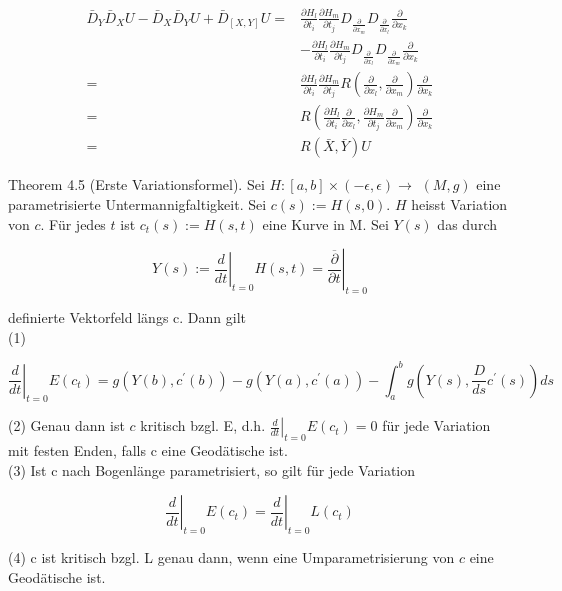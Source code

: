 \documentclass[10pt]{article}
\begin{document}
$$
\begin{aligned}
\bar{D}_{Y} \bar{D}_{X} U-\bar{D}_{X} \bar{D}_{Y} U+\bar{D}_{[X, Y]} U= & \frac{\partial H_{l}}{\partial t_{i}} \frac{\partial H_{m}}{\partial t_{j}} D_{\frac{\partial}{\partial x_{m}}} D_{\frac{\partial}{\partial x_{l}}} \frac{\partial}{\partial x_{k}} \\
& -\frac{\partial H_{l}}{\partial t_{i}} \frac{\partial H_{m}}{\partial t_{j}} D_{\frac{\partial}{\partial x_{l}}} D_{\frac{\partial}{\partial x_{m}}} \frac{\partial}{\partial x_{k}} \\
= & \frac{\partial H_{l}}{\partial t_{i}} \frac{\partial H_{m}}{\partial t_{j}} R\left(\frac{\partial}{\partial x_{l}}, \frac{\partial}{\partial x_{m}}\right) \frac{\partial}{\partial x_{k}} \\
= & R\left(\frac{\partial H_{l}}{\partial t_{i}} \frac{\partial}{\partial x_{l}}, \frac{\partial H_{m}}{\partial t_{j}} \frac{\partial}{\partial x_{m}}\right) \frac{\partial}{\partial x_{k}} \\
= & R(\bar{X}, \bar{Y}) U
\end{aligned}
$$

Theorem 4.5 (Erste Variationsformel). Sei $H:[a, b] \times(-\epsilon, \epsilon) \rightarrow$ $(M, g)$ eine parametrisierte Untermannigfaltigkeit. Sei $c(s):=H(s, 0)$. $H$ heisst Variation von $c$. Für jedes $t$ ist $c_{t}(s):=H(s, t)$ eine Kurve in M. Sei $Y(s)$ das durch

$$
Y(s):=\left.\frac{d}{d t}\right|_{t=0} H(s, t)=\left.\overline{\frac{\partial}{\partial t}}\right|_{t=0}
$$

definierte Vektorfeld längs c. Dann gilt\\
(1)

$$
\left.\frac{d}{d t}\right|_{t=0} E\left(c_{t}\right)=g\left(Y(b), c^{\prime}(b)\right)-g\left(Y(a), c^{\prime}(a)\right)-\int_{a}^{b} g\left(Y(s), \frac{D}{d s} c^{\prime}(s)\right) d s
$$

(2) Genau dann ist $c$ kritisch bzgl. E, d.h. $\left.\frac{d}{d t}\right|_{t=0} E\left(c_{t}\right)=0$ für jede Variation mit festen Enden, falls c eine Geodätische ist.\\
(3) Ist c nach Bogenlänge parametrisiert, so gilt für jede Variation

$$
\left.\frac{d}{d t}\right|_{t=0} E\left(c_{t}\right)=\left.\frac{d}{d t}\right|_{t=0} L\left(c_{t}\right)
$$

(4) c ist kritisch bzgl. L genau dann, wenn eine Umparametrisierung von $c$ eine Geodätische ist.
\end{document}
